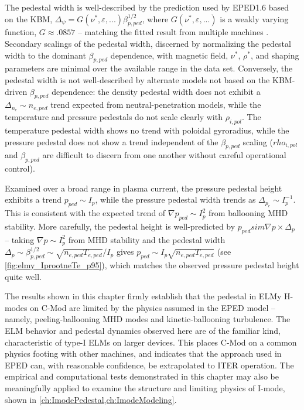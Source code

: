 The pedestal width is well-described by the prediction used by EPED1.6 based on the KBM, $\Delta_\psi = G(\nu^*,\varepsilon,...) \beta_{p,ped}^{1/2}$, where $G(\nu^*,\varepsilon,...)$ is a weakly varying function, $G \approx .0857$ -- matching the fitted result from multiple machines \cite{Groebner2013}.  Secondary scalings of the pedestal width, discerned by normalizing the pedestal width to the dominant $\beta_{p,ped}$ dependence, with magnetic field, $\nu^*$, $\rho^*$, and shaping parameters are minimal over the available range in the data set.  Conversely, the pedestal width is not well-described by alternate models not based on the KBM-driven $\beta_{p,ped}$ dependence: the density pedestal width does not exhibit a $\Delta_{n_e} \sim n_{e,ped}$ trend expected from neutral-penetration models, while the temperature and pressure pedestals do not scale clearly with $\rho_{i,pol}$.  The temperature pedestal width shows no trend with poloidal gyroradius, while the pressure pedestal does not show a trend independent of the $\beta_{p,ped}$ scaling ($rho_{i,pol}$ and $\beta_{p,ped}$ are difficult to discern from one another without careful operational control).

Examined over a broad range in plasma current, the pressure pedestal height exhibits a trend $p_{ped} \sim I_p$, while the pressure pedestal width trends as $\Delta_{p_e} \sim I_p^{-1}$.  This is consistent with the expected trend of $\nabla p_{ped} \sim I_p^2$ from ballooning MHD stability.  More carefully, the pedestal height is well-predicted by $p_{ped} sim \nabla p \times \Delta_{p}$ -- taking $\nabla p \sim I_p^2$ from MHD stability and the pedestal width $\Delta_{p} \sim \beta_{p,ped}^{1/2} \sim \sqrt{n_{e,ped} T_{e,ped}}/I_p$ gives $p_{ped} \sim I_p \sqrt{n_{e,ped} T_{e,ped}}$ (see \cref{fig:elmy_IprootneTe_p95}), which matches the observed pressure pedestal height quite well.  

The results shown in this chapter firmly establish that the pedestal in ELMy H-modes on C-Mod are limited by the physics assumed in the EPED model -- namely, peeling-ballooning MHD modes and kinetic-ballooning turbulence.  The ELM behavior and pedestal dynamics observed here are of the familiar kind, characteristic of type-I ELMs on larger devices.  This places C-Mod on a common physics footing with other machines, and indicates that the approach used in EPED can, with reasonable confidence, be extrapolated to ITER operation.  The empirical and computational tests demonstrated in this chapter may also be meaningfully applied to examine the structure and limiting physics of I-mode, shown in \cref{ch:ImodePedestal,ch:ImodeModeling}.\nicechapterending


